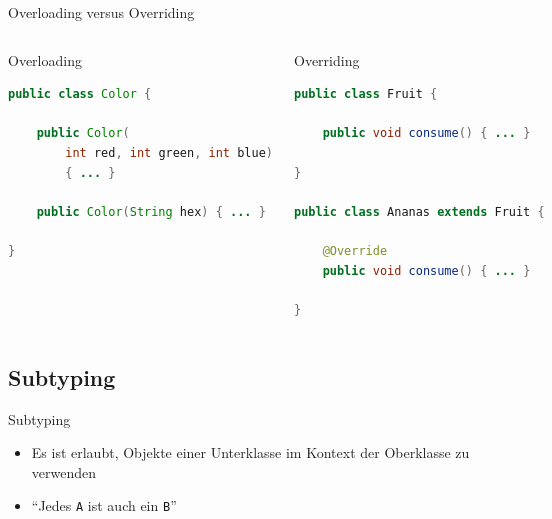 \documentclass[18pt]{beamer}
\newcommand{\quotes}[1]{``#1''}
\begin{document}
\begin{frame}[fragile]{Overloading versus Overriding}
    \begin{columns}[c]
        \begin{exampleblock}{Overloading}
            \begin{lstlisting}[language=Java,basicstyle=\scriptsize]
public class Color {

    public Color(
        int red, int green, int blue)
        { ... }

    public Color(String hex) { ... }

}
            \end{lstlisting}

        \end{exampleblock}


        \begin{exampleblock}{Overriding}
            \begin{lstlisting}[language=Java,basicstyle=\scriptsize]
public class Fruit {

    public void consume() { ... }

}

public class Ananas extends Fruit {

    @Override
    public void consume() { ... }

}
            \end{lstlisting}

        \end{exampleblock}

    \end{columns}
\end{frame}


\subsection{Subtyping}

\begin{frame}{Subtyping}
    \begin{block}{}
        \begin{itemize}
            \item Es ist erlaubt, Objekte einer Unterklasse im Kontext der Oberklasse zu verwenden
            \item \quotes{Jedes \texttt{A} ist auch ein \texttt{B}}
        \end{itemize}
    \end{block}

\end{frame}
\end{document}
